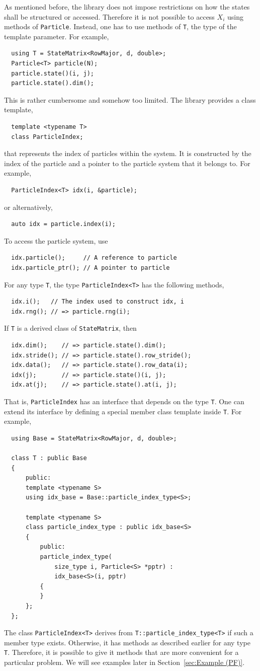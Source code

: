 As mentioned before, the library does not impose restrictions on how the states
shall be structured or accessed. Therefore it is not possible to access $X_i$
using methods of \verb|Particle|. Instead, one has to use methods of \verb|T|,
the type of the template parameter. For example,
\begin{Verbatim}
  using T = StateMatrix<RowMajor, d, double>;
  Particle<T> particle(N);
  particle.state()(i, j);
  particle.state().dim();
\end{Verbatim}
This is rather cumbersome and somehow too limited. The library provides a class
template,
\begin{Verbatim}
  template <typename T>
  class ParticleIndex;
\end{Verbatim}
that represents the index of particles within the system. It is constructed by
the index of the particle and a pointer to the particle system that it belongs
to. For example,
\begin{Verbatim}
  ParticleIndex<T> idx(i, &particle);
\end{Verbatim}
or alternatively,
\begin{Verbatim}
  auto idx = particle.index(i);
\end{Verbatim}
To access the particle system, use
\begin{Verbatim}
  idx.particle();     // A reference to particle
  idx.particle_ptr(); // A pointer to particle
\end{Verbatim}
For any type \verb|T|, the type \verb|ParticleIndex<T>| has the following
methods,
\begin{Verbatim}
  idx.i();   // The index used to construct idx, i
  idx.rng(); // => particle.rng(i);
\end{Verbatim}
If \verb|T| is a derived class of \verb|StateMatrix|, then
\begin{Verbatim}
  idx.dim();    // => particle.state().dim();
  idx.stride(); // => particle.state().row_stride();
  idx.data();   // => particle.state().row_data(i);
  idx(j);       // => particle.state()(i, j);
  idx.at(j);    // => particle.state().at(i, j);
\end{Verbatim}
That is, \verb|ParticleIndex| has an interface that depends on the type
\verb|T|. One can extend its interface by defining a special member class
template inside \verb|T|. For example,
\begin{Verbatim}
  using Base = StateMatrix<RowMajor, d, double>;

  class T : public Base
  {
      public:
      template <typename S>
      using idx_base = Base::particle_index_type<S>;

      template <typename S>
      class particle_index_type : public idx_base<S>
      {
          public:
          particle_index_type(
              size_type i, Particle<S> *pptr) :
              idx_base<S>(i, pptr)
          {
          }
      };
  };
\end{Verbatim}
The class \verb|ParticleIndex<T>| derives from \verb|T::particle_index_type<T>|
if such a member type exists. Otherwise, it has methods as described earlier
for any type \verb|T|. Therefore, it is possible to give it methods that are
more convenient for a particular problem. We will see examples later in
Section~\ref{sec:Example (PF)}.

